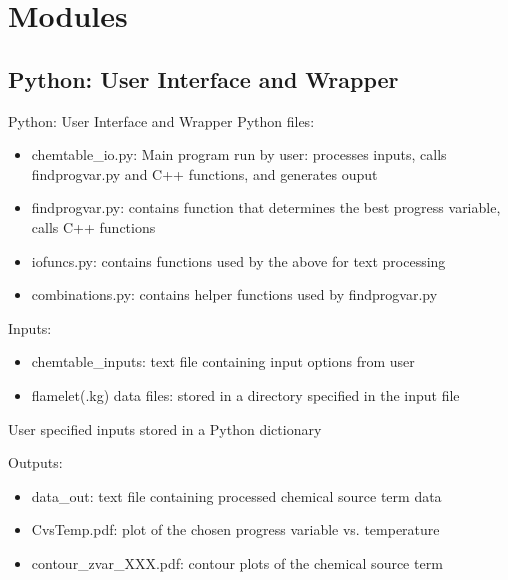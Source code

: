 \documentclass{beamer}
\begin{document}
\section{Modules}

\subsection{Python: User Interface and Wrapper}
\begin{frame}{Python: User Interface and Wrapper}
Python files:
\begin{itemize}
\item chemtable\_io.py: Main program run by user: processes inputs, calls findprogvar.py and C++ functions, and generates ouput %
\item findprogvar.py: contains function that determines the best progress variable, calls C++ functions
\item iofuncs.py: contains functions used by the above for text processing
\item combinations.py: contains helper functions used by findprogvar.py
\end{itemize}
Inputs:
\begin{itemize}
\item chemtable\_inputs: text file containing input options from user
\item flamelet(.kg) data files: stored in a directory specified in the input file
\end{itemize}
User specified inputs stored in a Python dictionary

Outputs:
\begin{itemize}
\item data\_out: text file containing processed chemical source term data
\item CvsTemp.pdf: plot of the chosen progress variable vs. temperature
\item contour\_zvar\_XXX.pdf: contour plots of the chemical source term
\end{itemize}


\end{frame}
\end{document}
